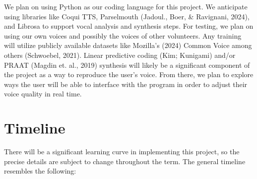 \documentclass{article}
\begin{document}
We plan on using Python as our coding language for this project. We anticipate using libraries like Coqui TTS, Parselmouth (Jadoul., Boer, \& Ravignani, 2024), and Librosa to support vocal analysis and synthesis steps. For testing, we plan on using our own voices and possibly the voices of other volunteers. Any training will utilize publicly available datasets like Mozilla’s (2024) Common Voice among others (Schwoebel, 2021). Linear predictive coding (Kim; Kunigami) and/or PRAAT (Magdin et. al., 2019) synthesis will likely be a significant component of the project as a way to reproduce the user's voice. From there, we plan to explore ways the user will be able to interface with the program in order to adjust their voice quality in real time.

\section{Timeline}\label{sec:page_size}

There will be a significant learning curve in implementing this project, so the precise details are subject to change throughout the term. The general timeline resembles the following:
\end{document}
